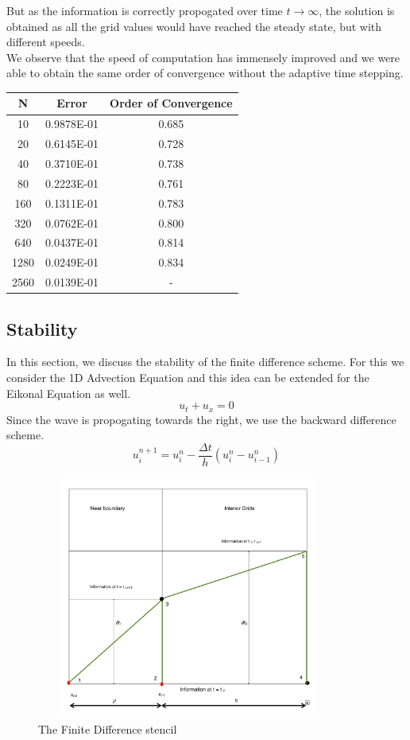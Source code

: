 \documentclass[11pt]{report}
\begin{document}
\noindent
But as the information is correctly propogated over time $t \to \infty$, the solution is obtained as all the grid values would have reached the steady state, but with different speeds.\\

\noindent
We observe that the speed of computation has immensely improved and we were able to obtain the same order of convergence without the adaptive time stepping. 
\begin{center}
	\begin{tabular}{|c|c|c|}
		\hline
		N & Error & Order of Convergence\\
		\hline
		10 & 0.9878E-01 & 0.685 \\
		\hline
		20 & 0.6145E-01 & 0.728 \\
		\hline	
		40 & 0.3710E-01 & 0.738 \\
		\hline	
		80 & 0.2223E-01 & 0.761 \\
		\hline	
		160 & 0.1311E-01 & 0.783 \\
		\hline	
		320 & 0.0762E-01 & 0.800  \\
		\hline
		640 & 0.0437E-01 & 0.814 \\
		\hline
		1280 & 0.0249E-01 & 0.834 \\
		\hline
		2560 & 0.0139E-01 & - \\
		\hline
	\end{tabular}
\end{center}
\pagebreak
\subsection{Stability}
In this section, we discuss the stability of the finite difference scheme. For this we consider the 1D Advection Equation and this idea can be extended for the Eikonal Equation as well.
\begin{equation}
	u_t + u_x = 0
\end{equation}
Since the wave is propogating towards the right, we use the backward difference scheme.
\begin{equation}
	u_i^{n+1} = u_i^n - \frac{\Delta t}{h} \left( u_i^n - u_{i-1}^n \right)
\end{equation}

\begin{figure}[h!]
	\centering
	\includegraphics[width = 10cm, height = 8cm]{stencil.png}
	\caption{The Finite Difference stencil}
	\label{fig:9}
\end{figure}
\end{document}
